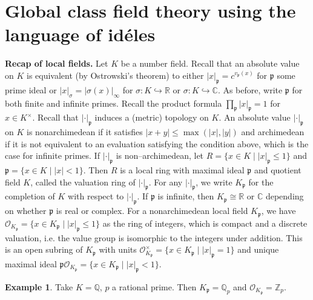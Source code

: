 \documentclass{article}
\theoremstyle{definition}
\newtheorem{example}{Example}[section]
\begin{document}
\section{Global class field theory using the language of id\'eles}
\textbf{Recap of local fields.} Let $K$ be a number field. Recall that an absolute value on $K$ is equivalent (by Ostrowski's theorem) to either $\left|x\right|_{\mathfrak{p}} = c^{v_{\mathfrak{p}}(x)}$ for $\mathfrak{p}$ some prime ideal or $\left|x\right|_{\sigma} = \left|\sigma(x)\right|_{\infty}$ for $\sigma: K \hookrightarrow \mathbb{R}$ or $\sigma: K \hookrightarrow \mathbb{C}$. As before, write $\mathfrak{p}$ for both finite and infinite primes. Recall the product formula $\prod_{\mathfrak{p}} \left|x\right|_{\mathfrak{p}} = 1$ for $x \in K^\times$. Recall that $\left|\cdot \right|_{\mathfrak{p}}$ induces a (metric) topology on $K$. An absolute value $\left|\cdot \right|_{\mathfrak{p}}$ on $K$ is nonarchimedean if it satisfies $\left|x+y\right|\le \max(\left|x\right|,\left|y\right|)$ and archimedean if it is not equivalent to an evaluation satisfying the condition above, which is the case for infinite primes. If $\left|\cdot \right|_{\mathfrak{p}}$ is non--archimedean, let $R = \{x \in K \mid \left|x\right|_{\mathfrak{p}}\le 1\}$ and $\mathfrak{p} = \{x \in K \mid \left|x\right|<1\}$. Then $R$ is a local ring with maximal ideal $\mathfrak{p}$ and quotient field $K$, called the valuation ring of $\left|\cdot \right|_{\mathfrak{p}}$. For any $\left|\cdot \right|_{\mathfrak{p}}$, we write $K_{\mathfrak{p}}$ for the completion of $K$ with respect to $\left|\cdot \right|_{\mathfrak{p}}$. If $\mathfrak{p}$ is infinite, then $K_{\mathfrak{p}}\cong \mathbb{R}$ or $\mathbb{C}$ depending on whether $\mathfrak{p}$ is real or complex. For a nonarchimedean local field $K_{\mathfrak{p}}$, we have $\mathcal{O}_{K_{\mathfrak{p}}} = \{x \in K_{\mathfrak{p}}\mid \left|x\right|_{\mathfrak{p}}\le 1\}$ as the ring of integers, which is compact and a discrete valuation, i.e. the value group is isomorphic to the integers under addition. This is an open subring of $K_{\mathfrak{p}}$ with units $\mathcal{O}_{K_\mathfrak{p}}^\times = \{x \in K_{\mathfrak{p}} \mid \left|x\right|_{\mathfrak{p}}=1\}$ and unique maximal ideal $\mathfrak{p}\mathcal{O}_{K_{\mathfrak{p}}}=\{x \in K_{\mathfrak{p}}\mid \left|x\right|_{\mathfrak{p}}<1\}$.

\begin{example}
    Take $K=\mathbb{Q}$, $p$ a rational prime. Then $K_{\mathfrak{p}} = \mathbb{Q}_{p}$ and $\mathcal{O}_{K_{\mathfrak{p}}}=\mathbb{Z}_p$.
\end{example}
\end{document}
